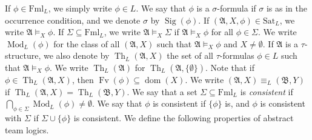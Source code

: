 \documentclass[a4paper]{amsart}
\theoremstyle{definition}
\theoremstyle{remark}
\newcommand{\A}{\mathcal{A}}
\newcommand{\B}{\mathcal{B}}
\DeclareMathOperator{\dom}{dom}
\DeclareMathOperator{\Fv}{Fv}
\theoremstyle{definition}
\renewcommand{\A}{\mathfrak{A}}
\renewcommand{\B}{\mathfrak{B}}
\DeclareMathOperator{\Th}{Th}
\DeclareMathOperator{\Sig}{Sig}
\newcommand{\Fml}{\mathrm{Fml}_L}
\newcommand{\Sat}{\mathrm{Sat}_L}
\DeclareMathOperator{\Mod}{Mod}
\begin{document}
If $\phi\in\Fml$, we simply write $\phi\in L$. We say that $\phi$ is a $\sigma$-formula if $\sigma$ is as in the occurrence condition, and we denote $\sigma$ by $\Sig(\phi)$. If $(\A,X,\phi)\in\Sat$, we write $\A\models_X\phi$. If $\Sigma\subseteq\Fml$, we write $\A\models_X\Sigma$ if $\A\models_X\phi$ for all $\phi\in\Sigma$. We write $\Mod_L(\phi)$ for the class of all $(\A,X)$ such that $\A\models_X\phi$ and $X\neq\emptyset$. If $\A$ is a $\tau$-structure, we also denote by $\Th_L(\A,X)$ the set of all $\tau$-formulas $\phi\in L$ such that $\A\models_X\phi$. We write $\Th_L(\A)$ for $\Th_L(\A,\{\emptyset\})$. Note that if $\phi\in\Th_L(\A,X)$, then $\Fv(\phi)\subseteq\dom(X)$. We write $(\A,X)\equiv_L(\B,Y)$ if $\Th_L(\A,X) = \Th_L(\B,Y)$. We say that a set $\Sigma\subseteq\Fml$ is \emph{consistent} if $\bigcap_{\phi\in\Sigma}\Mod_L(\phi)\neq\emptyset$. We say that $\phi$ is consistent if $\{\phi\}$ is, and $\phi$ is consistent with $\Sigma$ if $\Sigma\cup\{\phi\}$ is consistent. We define the following properties of abstract team logics.
\end{document}
